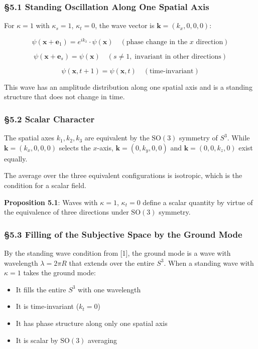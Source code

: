 \documentclass[
  a4paper,11pt]{article}
\providecommand{\tightlist}{%
  \setlength{\itemsep}{0pt}\setlength{\parskip}{0pt}}
\theoremstyle{definition}
\theoremstyle{remark}
\begin{document}
\subsubsection{§5.1 Standing Oscillation Along One Spatial
Axis}\label{standing-oscillation-along-one-spatial-axis}

For \(\kappa = 1\) with \(\kappa_s = 1\), \(\kappa_t = 0\), the wave
vector is \(\mathbf{k} = (k_x, 0, 0, 0)\):

\[\psi(\mathbf{x} + \mathbf{e}_1) = e^{ik_x} \cdot \psi(\mathbf{x}) \quad (\text{phase change in the $x$ direction})\]

\[\psi(\mathbf{x} + \mathbf{e}_s) = \psi(\mathbf{x}) \quad (s \neq 1,\; \text{invariant in other directions})\]

\[\psi(\mathbf{x}, t + 1) = \psi(\mathbf{x}, t) \quad (\text{time-invariant})\]

This wave has an amplitude distribution along one spatial axis and is a
standing structure that does not change in time.

\subsubsection{§5.2 Scalar Character}\label{scalar-character}

The spatial axes \(k_1, k_2, k_3\) are equivalent by the
\(\mathrm{SO}(3)\) symmetry of \(S^3\). While
\(\mathbf{k} = (k_x, 0, 0, 0)\) selects the \(x\)-axis,
\(\mathbf{k} = (0, k_y, 0, 0)\) and \(\mathbf{k} = (0, 0, k_z, 0)\)
exist equally.

The average over the three equivalent configurations is isotropic, which
is the condition for a scalar field.

\textbf{Proposition 5.1}: Waves with \(\kappa = 1\), \(\kappa_t = 0\)
define a scalar quantity by virtue of the equivalence of three
directions under \(\mathrm{SO}(3)\) symmetry.

\subsubsection{§5.3 Filling of the Subjective Space by the Ground
Mode}\label{filling-of-the-subjective-space-by-the-ground-mode}

By the standing wave condition from {[}1{]}, the ground mode is a wave
with wavelength \(\lambda = 2\pi R\) that extends over the entire
\(S^3\). When a standing wave with \(\kappa = 1\) takes the ground mode:

\begin{itemize}
\tightlist
\item
  It fills the entire \(S^3\) with one wavelength
\item
  It is time-invariant (\(k_t = 0\))
\item
  It has phase structure along only one spatial axis
\item
  It is scalar by \(\mathrm{SO}(3)\) averaging
\end{itemize}
\end{document}

